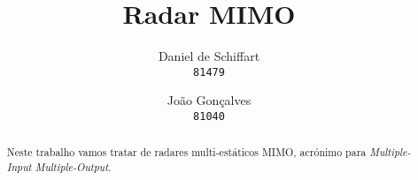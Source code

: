\documentclass[palatino,portuguese]{ist-report}
\author{Daniel de Schiffart \\ \texttt{81479} \and João Gonçalves \\ \texttt{81040}}
\title{Radar MIMO}
\subtitle{}
\begin{document}
\makecover

{ \tableofcontents}

\begin{abstract}
	Neste trabalho vamos tratar de radares multi-estáticos MIMO, acrónimo para \textit{Multiple-Input Multiple-Output}.
\end{abstract}
\end{document}
